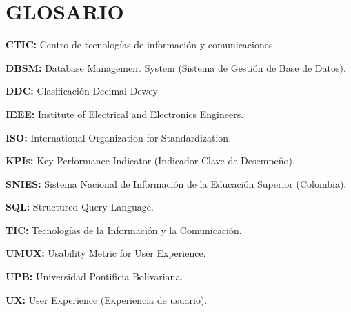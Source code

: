 \documentclass[spanish]{ieee_upb}
\begin{document}
\newpage
{} 
\renewcommand\listtablename{\hfill\normalfont\bfseries LISTA DE TABLAS\hfill}
\listoftables

\newpage
\renewcommand\listfigurename{\hfill\normalfont\bfseries LISTA DE FIGURAS\hfill}
\listoffigures



\newpage
\section*{GLOSARIO}
\textbf{CTIC: } Centro de tecnologías de información y comunicaciones

\vspace{0.1cm}
\textbf{DBSM: } Database Management System (Sistema de Gestión de Base de Datos).

\vspace{0.1cm}
\textbf{DDC: } Clasificación Decimal Dewey

\vspace{0.1cm}
\textbf{IEEE: } Institute of Electrical and Electronics Engineers. 

\vspace{0.1cm}
\textbf{ISO: } International Organization for Standardization.

\vspace{0.1cm}
\textbf{KPIs: } Key Performance Indicator (Indicador Clave de Desempeño). 

\vspace{0.1cm}
\textbf{SNIES: } Sistema Nacional de Información de la Educación Superior (Colombia). 

\vspace{0.1cm}
\textbf{SQL: } Structured Query Language. 

\vspace{0.1cm}
\textbf{TIC: } Tecnologías de la Información y la Comunicación.

\vspace{0.1cm}
\textbf{UMUX: } Usability Metric for User Experience.

\vspace{0.1cm}
\textbf{UPB: } Universidad Pontificia Bolivariana.

\vspace{0.1cm}
\textbf{UX: } User Experience (Experiencia de usuario). 
\end{document}
